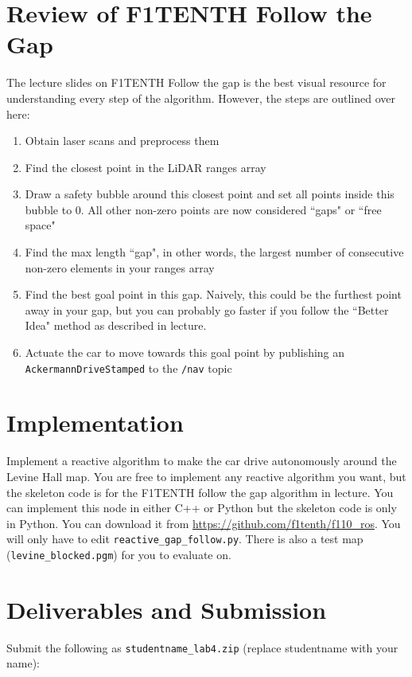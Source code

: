 \documentclass[letta4 paper]{article}
\numberwithin{equation}{section}
\newcommand{\0}{\mathbf{0}}
\begin{document}
	\section{Review of F1TENTH Follow the Gap}
	The lecture slides on F1TENTH Follow the gap is the best visual resource for understanding every step of the algorithm. However, the steps are outlined over here:
	\begin{enumerate}
		\item Obtain laser scans and preprocess them 
		\item Find the closest point in the LiDAR ranges array
		\item Draw a safety bubble around this closest point and set all points inside this bubble to 0. All other non-zero points are now considered ``gaps" or ``free space"
		\item Find the max length ``gap", in other words, the largest number of consecutive non-zero elements in your ranges array
		\item Find the best goal point in this gap. Naively, this could be the furthest point away in your gap, but you can probably go faster if you follow the ``Better Idea" method as described in lecture. 
		\item Actuate the car to move towards this goal point by publishing an \texttt{AckermannDriveStamped} to the \texttt{/nav} topic
	\end{enumerate}
	
	
	\section{Implementation}
	Implement a reactive algorithm to make the car drive autonomously around the Levine Hall map. You are free to implement any reactive algorithm  you want, but the skeleton code is for the F1TENTH follow the gap algorithm in lecture. You can implement this node in either C++ or Python but the skeleton code is only in Python. You can download it from \href{https://github.com/f1tenth/f110_ros}{https://github.com/f1tenth/f110\_ros}. You will only have to edit \texttt{reactive\_gap\_follow.py}. There is also a test map (\texttt{levine\_blocked.pgm}) for you to evaluate on.
	

	\section{Deliverables and Submission}
	Submit the following as \texttt{studentname\_lab4.zip} (replace studentname with your name):
	
\end{document}
